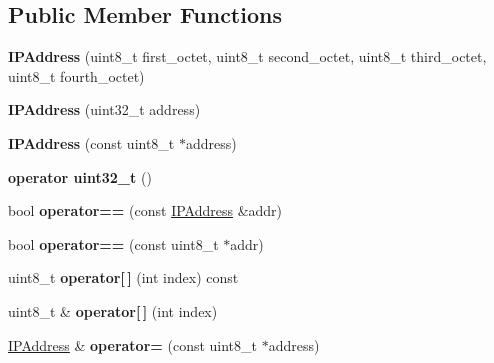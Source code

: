 \subsection*{Public Member Functions}
\begin{DoxyCompactItemize}
\item 
\hypertarget{class_i_p_address_a00b68db2117680a85111da0791c0479d}{{\bfseries I\-P\-Address} (uint8\-\_\-t first\-\_\-octet, uint8\-\_\-t second\-\_\-octet, uint8\-\_\-t third\-\_\-octet, uint8\-\_\-t fourth\-\_\-octet)}\label{class_i_p_address_a00b68db2117680a85111da0791c0479d}

\item 
\hypertarget{class_i_p_address_a245b8f4f95796da669d51b400ae2b896}{{\bfseries I\-P\-Address} (uint32\-\_\-t address)}\label{class_i_p_address_a245b8f4f95796da669d51b400ae2b896}

\item 
\hypertarget{class_i_p_address_a445de5f4af39b98bf10e8d77832cfe5f}{{\bfseries I\-P\-Address} (const uint8\-\_\-t $\ast$address)}\label{class_i_p_address_a445de5f4af39b98bf10e8d77832cfe5f}

\item 
\hypertarget{class_i_p_address_a9e5f55cf6004b9dd31ffa23eea2da593}{{\bfseries operator uint32\-\_\-t} ()}\label{class_i_p_address_a9e5f55cf6004b9dd31ffa23eea2da593}

\item 
\hypertarget{class_i_p_address_a5caaec923844f59530a74c164bea1ea3}{bool {\bfseries operator==} (const \hyperlink{class_i_p_address}{I\-P\-Address} \&addr)}\label{class_i_p_address_a5caaec923844f59530a74c164bea1ea3}

\item 
\hypertarget{class_i_p_address_a5d8e1f950bdfa198a47d30a9ea1183ab}{bool {\bfseries operator==} (const uint8\-\_\-t $\ast$addr)}\label{class_i_p_address_a5d8e1f950bdfa198a47d30a9ea1183ab}

\item 
\hypertarget{class_i_p_address_a3a30e06242fc12a5aed67bfd77d1b2a5}{uint8\-\_\-t {\bfseries operator\mbox{[}$\,$\mbox{]}} (int index) const }\label{class_i_p_address_a3a30e06242fc12a5aed67bfd77d1b2a5}

\item 
\hypertarget{class_i_p_address_a362f02e2923dd74e0fc935eab183429d}{uint8\-\_\-t \& {\bfseries operator\mbox{[}$\,$\mbox{]}} (int index)}\label{class_i_p_address_a362f02e2923dd74e0fc935eab183429d}

\item 
\hypertarget{class_i_p_address_ae51d1758e3e7bfdb947bef318c300e7c}{\hyperlink{class_i_p_address}{I\-P\-Address} \& {\bfseries operator=} (const uint8\-\_\-t $\ast$address)}\label{class_i_p_address_ae51d1758e3e7bfdb947bef318c300e7c}


\end{DoxyCompactItemize}
